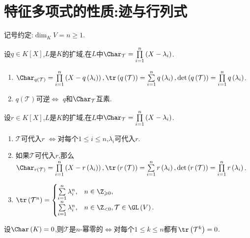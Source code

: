\section{特征多项式的性质:迹与行列式}

记号约定:$\dim_{K}V=n\geq 1$.

\begin{proposition}{}{}
	设$q\in K[X]$,$L$是$K$的扩域,在$L$中$\Char_{\mathcal{T}}=\prod\limits_{i=1}^{n}\left(X-\lambda_{i}\right)$.
	\begin{enumerate}
		\item $\Char_{q\left(\mathcal{T}\right)}=\prod\limits_{i=1}^{n}\left(X-q\left(\lambda_{i}\right)\right),\tr\left(q\left(\mathcal{T}\right)\right)=\sum\limits_{i=1}^{n}q\left(\lambda_{i}\right),\det\left(q\left(\mathcal{T}\right)\right)=\prod\limits_{i=1}^{n}q\left(\lambda_{i}\right)$.
		\item $q\left(\mathcal{T}\right)$可逆$\iff$ $q$和$\Char_{\mathcal{T}}$互素.
	\end{enumerate}
\end{proposition}

\begin{corollary}{}{}
	设$r\in K[X]$,$L$是$K$的扩域,在$L$中$\Char_{\mathcal{T}}=\prod\limits_{i=1}^{n}\left(X-\lambda_{i}\right)$.
	\begin{enumerate}
		\item $\mathcal{T}$可代入$r$ $\iff$对每个$1\leq i\leq n$,$\lambda_{i}$可代入$r$.
		\item 如果$\mathcal{T}$可代入$r$,那么$\Char_{r\left(\mathcal{T}\right)}=\prod\limits_{i=1}^{n}\left(X-r\left(\lambda_{i}\right)\right),\tr\left(r\left(\mathcal{T}\right)\right)=\sum\limits_{i=1}^{n}r\left(\lambda_{i}\right),\det\left(r\left(\mathcal{T}\right)\right)=\prod\limits_{i=1}^{n}r\left(\lambda_{i}\right)$.
		\item $\tr\left(\mathcal{T}^{n}\right)=
		\begin{cases}
			\sum\limits_{i=1}^{n}\lambda_{i}^{n},&n\in\Z_{\geqslant 0},\\
			\sum\limits_{i=1}^{n}\lambda_{i}^{n},&n\in\Z_{<0},\mathcal{T}\in\GL\left(V\right).
		\end{cases}$
	\end{enumerate}
\end{corollary}

\begin{corollary}{}{}
	设$\Char\left(K\right)=0$,则$\mathcal{T}$是$n$-幂零的$\iff$对每个$1\leq k\leq n$都有$\tr\left(\mathcal{T}^{k}\right)=0$.
\end{corollary}

